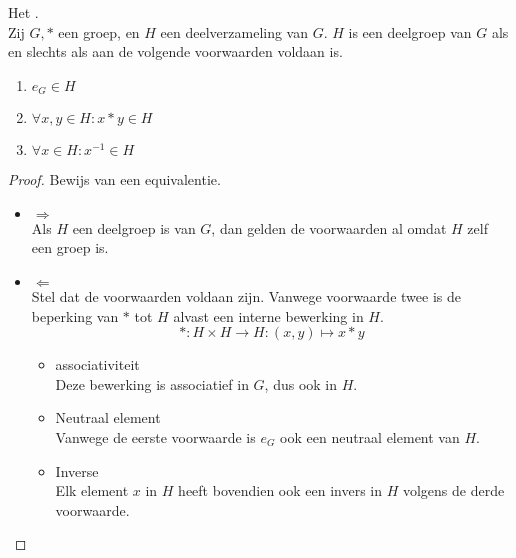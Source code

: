 \documentclass[main.tex]{subfiles}
\begin{document}
\begin{st}
  \label{st:criterium-deelgroep}
  Het .\\
  Zij $G,*$ een groep, en $H$ een deelverzameling van $G$.
  $H$ is een deelgroep van $G$ als en slechts als aan de volgende voorwaarden voldaan is.
  \begin{enumerate}
  \item $e_{G} \in H$
  \item $\forall x,y \in H: x * y \in H$
  \item $\forall x \in H: x^{-1} \in H$
  \end{enumerate}

  \begin{proof}
    Bewijs van een equivalentie.
    \begin{itemize}
    \item $\Rightarrow$\\
      Als $H$ een deelgroep is van $G$, dan gelden de voorwaarden al omdat $H$ zelf een groep is.
    \item $\Leftarrow$\\
      Stel dat de voorwaarden voldaan zijn. Vanwege voorwaarde twee is de beperking van $*$ tot $H$ alvast een interne bewerking in $H$.
      \[ *: H \times H \rightarrow H: (x,y) \mapsto x*y \]
      \begin{itemize}
      \item associativiteit\\
      Deze bewerking is associatief in $G$, dus ook in $H$.
      \item Neutraal element\\
      Vanwege de eerste voorwaarde is $e_{G}$ ook een neutraal element van $H$.
      \item Inverse\\
      Elk element $x$ in $H$ heeft bovendien ook een invers in $H$ volgens de derde voorwaarde.
      \end{itemize}
    \end{itemize}
  \end{proof}
\end{st}
\end{document}

